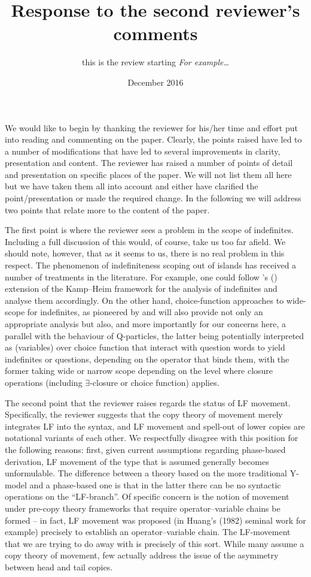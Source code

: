 \documentclass[11pt]{article}
\newcommand{\citeposs}[1]{\citeauthor{#1}'s (\citeyear{#1})}
\begin{document}
\title{Response to the second reviewer's comments}
\author{this is the review starting \textit{For example\ldots}}
\date{December 2016}

\maketitle
We would like to begin by thanking the reviewer for his/her time and effort put into reading and commenting on the paper. Clearly, the points raised have led to a number of modifications that have led to several improvements in clarity, presentation and content.  The reviewer has raised a number of points of detail and presentation on specific places of the paper. We will not list them all here but we have taken them all into account and either have clarified the point/presentation or made the required change. In the following we will address two points that relate more to the content of the paper.

The first point is where the reviewer sees a problem in the scope of indefinites. Including a full discussion of this would, of course, take us too far afield. We should note, however, that as it seems to us, there is no real problem in this respect. The phenomenon of indefiniteness scoping out of islands has received a number of treatments in the literature.  For example, one could follow \citeposs{abusch:94} extension of the Kamp--Heim framework for the analysis of indefinites and analyse them accordingly. On the other hand, choice-function approaches to wide-scope for indefinites, as pioneered by \citet{Reinhart:1997} and \citet{winter:1997a} will also provide not only an appropriate analysis but also, and more importantly for our concerns here, a parallel with the behaviour of Q-particles, the latter being potentially interpreted as (variables) over choice function that interact with question words to yield indefinites or questions, depending on the operator that binds them, with the former taking wide or narrow scope depending on the level where closure operations (including $\exists$-closure or choice function) applies.

The second point that the reviewer raises regards the status of LF movement. Specifically, the reviewer suggests that the copy theory of movement merely integrates LF into the syntax, and LF movement and spell-out of lower copies are notational variants of each other. We respectfully disagree with this position for the following reasons: first, given current assumptions regarding phase-based derivation, LF movement of the type that is assumed generally becomes unformulable. The difference between a theory based on the more traditional Y-model and a phase-based one is that in the latter there can be no syntactic operations on the ``LF-branch''. Of specific concern is the notion of movement under pre-copy theory frameworks that require operator--variable chains be formed -- in fact, LF movement was proposed (in Huang's (1982) seminal work for example) precisely to establish an operator--variable chain. The LF-movement that we are trying to do away with is precisely of this sort. While many assume a copy theory of movement, few actually address the issue of the asymmetry between head and tail copies.
\end{document}
